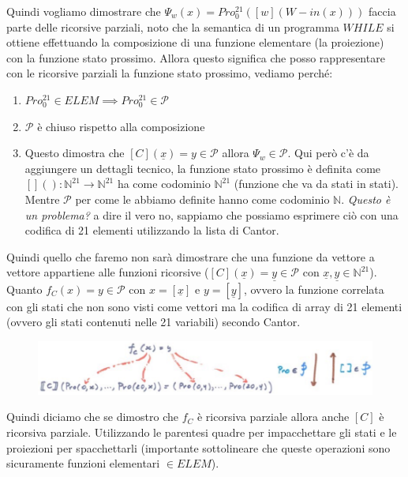 \documentclass{article}
\begin{document}
Quindi vogliamo dimostrare che $\Psi_w(x)=Pro_0^{21}([w](W-in(x)))$ faccia parte delle
ricorsive parziali, noto che la semantica di un programma $WHILE$ si ottiene effettuando
la composizione di una funzione elementare (la proiezione) con la funzione stato prossimo.
Allora questo significa che posso rappresentare con le ricorsive parziali la funzione
stato prossimo, vediamo perché:
\begin{enumerate}
    \item $Pro_0^{21}\in ELEM\implies Pro_0^{21}\in\mathcal{P}$
    \item $\mathcal{P}$ è chiuso rispetto alla composizione
    \item Questo dimostra che $[C](\underline{x})=y\in\mathcal{P}$ allora $\Psi_w\in\mathcal{P}$. Qui
          però c'è da aggiungere un dettagli tecnico, la funzione stato prossimo è definita come $[]():\mathbb{N}^{21}\rightarrow\mathbb{N}^{21}$
          ha come codominio $\mathbb{N}^{21}$ (funzione che va da stati in stati). Mentre $\mathcal{P}$ per come le abbiamo
          definite hanno come codominio $\mathbb{N}$. \textit{Questo è un problema?} a dire il vero no, sappiamo che possiamo
          esprimere ciò con una codifica di 21 elementi utilizzando la lista di Cantor.
\end{enumerate}
Quindi quello che faremo non sarà dimostrare che una funzione da vettore a vettore appartiene
alle funzioni ricorsive ($[C](\underline{x})=\underline{y}\in\mathcal{P}$ con $\underline{x},\underline{y}\in\mathbb{N}^{21}$).
Quanto $f_C(x)=y\in\mathcal{P}$ con $x=[\underline{x}]$ e $y=[\underline{y}]$, ovvero la funzione
correlata con gli stati che non sono visti come vettori ma la codifica di array di 21 elementi (ovvero
gli stati contenuti nelle 21 variabili) secondo Cantor.
\begin{figure}[H]
    \centering
    \includegraphics[scale=0.5]{images/ric-parz.png}
\end{figure}
Quindi diciamo che se dimostro che $f_C$ è ricorsiva parziale allora anche $[C]$ è ricorsiva
parziale. Utilizzando le parentesi quadre per impacchettare gli stati e le proiezioni per
spacchettarli (importante sottolineare che queste operazioni sono sicuramente
funzioni elementari $\in ELEM$).
\end{document}
